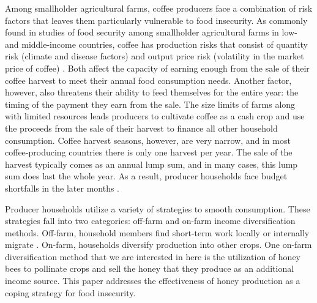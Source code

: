 \documentclass[../main.tex]{subfiles}
\begin{document}
Among smallholder agricultural farms, coffee producers face a combination of risk factors that leaves them particularly vulnerable to food insecurity. As commonly found in studies of food security among smallholder agricultural farms in low- and middle-income countries, coffee has production risks that consist of quantity risk (climate and disease factors) \parencite{karlan_agricultural_2014, mcintosh_utility_2019} and output price risk (volatility in the market price of coffee) \parencite{bellemare_welfare_2013, boyd_why_2022}. Both affect the capacity of earning enough from the sale of their coffee harvest to meet their annual food consumption needs. Another factor, however, also threatens their ability to feed themselves for the entire year: the timing of the payment they earn from the sale. The size limits of farms along with limited resources leads producers to cultivate coffee as a cash crop and use the proceeds from the sale of their harvest to finance all other household consumption. Coffee harvest seasons, however, are very narrow, and in most coffee-producing countries there is only one harvest per year. The sale of the harvest typically comes as an annual lump sum, and in many cases, this lump sum does last the whole year. As a result, producer households face budget shortfalls in the later months \parencite{mani_poverty_2013}.

Producer households utilize a variety of strategies to smooth consumption. These strategies fall into two categories: off-farm and on-farm income diversification methods. Off-farm, household members find short-term work locally or internally migrate \parencite{bacon_explaining_2014}. On-farm, households diversify production into other crops. One on-farm diversification method that we are interested in here is the utilization of honey bees to pollinate crops and sell the honey that they produce as an additional income source. This paper addresses the effectiveness of honey production as a coping strategy for food insecurity.
\end{document}
